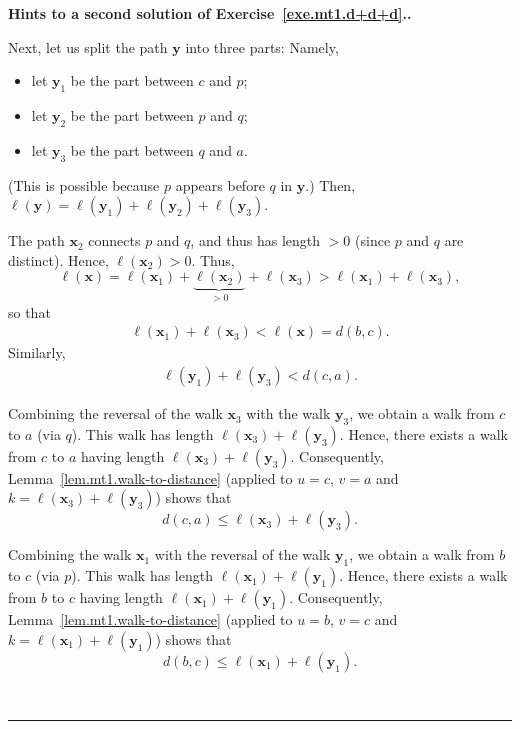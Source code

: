 \documentclass[numbers=enddot,12pt,final,onecolumn,notitlepage]{scrartcl}%
\theoremstyle{definition}
\newenvironment{proof}[1][Proof]{\noindent\textbf{#1.} }{\ \rule{0.5em}{0.5em}}
\newcommand{\tup}[1]{\left( #1 \right)}
\begin{document}
\begin{proof}[Hints to a second solution of Exercise~\ref{exe.mt1.d+d+d}.]
{Next, let us split the path $\mathbf{y}$ into three parts: Namely,
\begin{itemize}
\item let $\mathbf{y}_1$ be the part between $c$ and $p$;
\item let $\mathbf{y}_2$ be the part between $p$ and $q$;
\item let $\mathbf{y}_3$ be the part between $q$ and $a$.
\end{itemize}
(This is possible because $p$ appears before $q$ in $\mathbf{y}$.)
Then, $\ell\tup{\mathbf{y}} = \ell\tup{\mathbf{y}_1}
+ \ell\tup{\mathbf{y}_2} + \ell\tup{\mathbf{y}_3}$.

The path $\mathbf{x}_2$ connects $p$ and $q$, and thus has length $>0$
(since $p$ and $q$ are distinct). Hence, $\ell\tup{\mathbf{x}_2} > 0$.
Thus,
\[
\ell\tup{\mathbf{x}}
= \ell\tup{\mathbf{x}_1}
   + \underbrace{\ell\tup{\mathbf{x}_2}}_{> 0}
   + \ell\tup{\mathbf{x}_3}
> \ell\tup{\mathbf{x}_1} + \ell\tup{\mathbf{x}_3} ,
\]
so that
\begin{align}
\ell\tup{\mathbf{x}_1} + \ell\tup{\mathbf{x}_3}
< \ell\tup{\mathbf{x}} = d \tup{b, c} .
\label{pf.exe.mt1.d+d+d.hint.fn1.more1}
\end{align}
Similarly,
\begin{align}
\ell\tup{\mathbf{y}_1} + \ell\tup{\mathbf{y}_3}
< d \tup{c, a} .
\label{pf.exe.mt1.d+d+d.hint.fn1.more2}
\end{align}

Combining the reversal of the walk $\mathbf{x}_3$ with the walk
$\mathbf{y}_3$, we obtain a walk from $c$ to $a$ (via $q$). This walk
has length $\ell\tup{\mathbf{x}_3} + \ell\tup{\mathbf{y}_3}$. Hence,
there exists a walk from $c$ to $a$ having length
$\ell\tup{\mathbf{x}_3} + \ell\tup{\mathbf{y}_3}$. Consequently,
Lemma~\ref{lem.mt1.walk-to-distance} (applied to $u = c$, $v = a$
and $k = \ell\tup{\mathbf{x}_3} + \ell\tup{\mathbf{y}_3}$) shows that
\begin{equation}
d \tup{c, a} \leq \ell\tup{\mathbf{x}_3} + \ell\tup{\mathbf{y}_3} .
\label{pf.exe.mt1.d+d+d.hint.fn1.1}
\end{equation}

Combining the walk $\mathbf{x}_1$ with the reversal of the walk
$\mathbf{y}_1$, we obtain a walk from $b$ to $c$ (via $p$). This walk
has length $\ell\tup{\mathbf{x}_1} + \ell\tup{\mathbf{y}_1}$. Hence,
there exists a walk from $b$ to $c$ having length
$\ell\tup{\mathbf{x}_1} + \ell\tup{\mathbf{y}_1}$. Consequently,
Lemma~\ref{lem.mt1.walk-to-distance} (applied to $u = b$, $v = c$
and $k = \ell\tup{\mathbf{x}_1} + \ell\tup{\mathbf{y}_1}$) shows that
\begin{equation}
d \tup{b, c} \leq \ell\tup{\mathbf{x}_1} + \ell\tup{\mathbf{y}_1} .
\label{pf.exe.mt1.d+d+d.hint.fn1.2}
\end{equation}

}
\end{proof}
\end{document}
